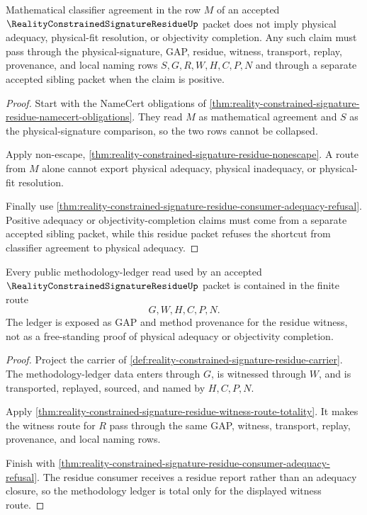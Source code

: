 \begin{theorem}
\label{thm:reality-constrained-signature-residue-mathematical-agreement-refusal}
Mathematical classifier agreement in the row $M$ of an accepted $\RealityConstrainedSignatureResidueUp$ packet does not imply physical adequacy, physical-fit resolution, or objectivity completion. Any such claim must pass through the physical-signature, GAP, residue, witness, transport, replay, provenance, and local naming rows $S,G,R,W,H,C,P,N$ and through a separate accepted sibling packet when the claim is positive.
\end{theorem}
\begin{proof}
Start with the NameCert obligations of \autoref{thm:reality-constrained-signature-residue-namecert-obligations}. They read $M$ as mathematical agreement and $S$ as the physical-signature comparison, so the two rows cannot be collapsed.

Apply non-escape, \autoref{thm:reality-constrained-signature-residue-nonescape}. A route from $M$ alone cannot export physical adequacy, physical inadequacy, or physical-fit resolution.

Finally use \autoref{thm:reality-constrained-signature-residue-consumer-adequacy-refusal}. Positive adequacy or objectivity-completion claims must come from a separate accepted sibling packet, while this residue packet refuses the shortcut from classifier agreement to physical adequacy.
\end{proof}

\begin{theorem}
\label{thm:reality-constrained-signature-residue-methodology-ledger-totality}
Every public methodology-ledger read used by an accepted $\RealityConstrainedSignatureResidueUp$ packet is contained in the finite route
$$
G,W,H,C,P,N.
$$
The ledger is exposed as GAP and method provenance for the residue witness, not as a free-standing proof of physical adequacy or objectivity completion.
\end{theorem}
\begin{proof}
Project the carrier of \autoref{def:reality-constrained-signature-residue-carrier}. The methodology-ledger data enters through $G$, is witnessed through $W$, and is transported, replayed, sourced, and named by $H,C,P,N$.

Apply \autoref{thm:reality-constrained-signature-residue-witness-route-totality}. It makes the witness route for $R$ pass through the same GAP, witness, transport, replay, provenance, and local naming rows.

Finish with \autoref{thm:reality-constrained-signature-residue-consumer-adequacy-refusal}. The residue consumer receives a residue report rather than an adequacy closure, so the methodology ledger is total only for the displayed witness route.
\end{proof}

